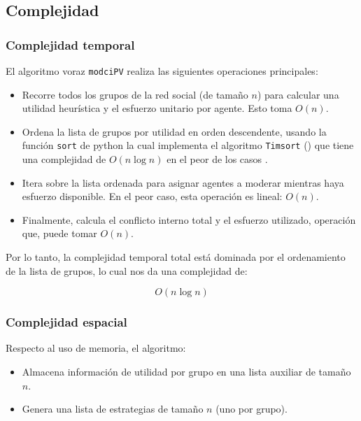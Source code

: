 \documentclass[11pt,letter]{article}
\begin{document}
    \subsection{Complejidad}

    \subsubsection{Complejidad temporal}

    El algoritmo voraz \texttt{modciPV} realiza las siguientes operaciones principales:

    \begin{itemize}
        \item Recorre todos los grupos de la red social (de tamaño $n$) para calcular una utilidad heurística y el esfuerzo unitario por agente. Esto toma ${O}(n)$.
        \item Ordena la lista de grupos por utilidad en orden descendente, usando la función \texttt{sort} de python la cual implementa el algoritmo \texttt{Timsort} (\cite{python_sorting}) que tiene una complejidad de ${O}(n \log n)$ en el peor de los casos \cite{Auger2018}.
        \item Itera sobre la lista ordenada para asignar agentes a moderar mientras haya esfuerzo disponible. En el peor caso, esta operación es lineal: ${O}(n)$.
        \item Finalmente, calcula el conflicto interno total y el esfuerzo utilizado, operación que, puede tomar ${O}(n)$.
    \end{itemize}

    Por lo tanto, la complejidad temporal total está dominada por el ordenamiento de la lista de grupos, lo cual nos da una complejidad de:

    \[
            {O}(n \log n)
    \]

    \subsubsection{Complejidad espacial}

    Respecto al uso de memoria, el algoritmo:

    \begin{itemize}
        \item Almacena información de utilidad por grupo en una lista auxiliar de tamaño $n$.
        \item Genera una lista de estrategias de tamaño $n$ (uno por grupo).
    \end{itemize}
\end{document}
